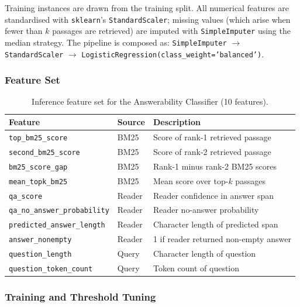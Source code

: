 Training instances are drawn from the training split. All numerical features
are standardised with \texttt{sklearn}'s \texttt{StandardScaler}; missing values
(which arise when fewer than $k$ passages are retrieved) are imputed with
\texttt{SimpleImputer} using the median strategy. The pipeline is composed as:
\texttt{SimpleImputer} $\rightarrow$ \texttt{StandardScaler} $\rightarrow$ \texttt{LogisticRegression(class\_weight='balanced')}.

\subsubsection{Feature Set}

\begin{table}[htbp]
  \centering
  \caption{Inference feature set for the Answerability Classifier (10 features).}
  \label{tab:features}
  \begin{tabular}{lll}
    \toprule
    \textbf{Feature} & \textbf{Source} & \textbf{Description} \\
    \midrule
    \texttt{top\_bm25\_score}        & BM25 & Score of rank-1 retrieved passage \\
    \texttt{second\_bm25\_score}     & BM25 & Score of rank-2 retrieved passage \\
    \texttt{bm25\_score\_gap}        & BM25 & Rank-1 minus rank-2 BM25 scores \\
    \texttt{mean\_topk\_bm25}        & BM25 & Mean score over top-$k$ passages \\
    \texttt{qa\_score}               & Reader & Reader confidence in answer span \\
    \texttt{qa\_no\_answer\_probability} & Reader & Reader no-answer probability \\
    \texttt{predicted\_answer\_length} & Reader & Character length of predicted span \\
    \texttt{answer\_nonempty}        & Reader & 1 if reader returned non-empty answer \\
    \texttt{question\_length}        & Query & Character length of question \\
    \texttt{question\_token\_count}  & Query & Token count of question \\
    \bottomrule
  \end{tabular}
\end{table}

\subsubsection{Training and Threshold Tuning}

